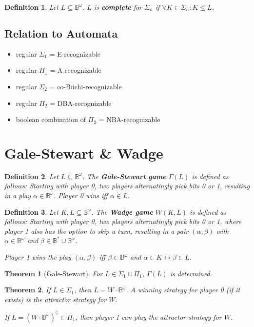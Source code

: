 \documentclass{article}
\newtheorem{theorem}{Theorem}
\newtheorem{definition}{Definition}
\begin{document}
\begin{definition}
	Let $L \subseteq \mathbb{B}^\omega$. $L$ is \textbf{complete} for $\Sigma_n$ if $\forall K \in \Sigma_n: K \leq L$. 
\end{definition}


\subsection{Relation to Automata}
\begin{itemize}
	\item regular $\Sigma_1$ = E-recognizable
	\item regular $\Pi_1$ = A-recognizable
	\item regular $\Sigma_2$ = co-Büchi-recognizable
	\item regular $\Pi_2$ = DBA-recognizable
	\item boolean combination of $\Pi_2$ = NBA-recognizable
\end{itemize}


\section{Gale-Stewart \& Wadge}
\begin{definition}
	Let $L \subseteq \mathbb{B}^\omega$. The \textbf{Gale-Stewart game} $\Gamma(L)$ is defined as follows: Starting with player 0, two players alternatingly pick bits 0 or 1, resulting in a play $\alpha \in \mathbb{B}^\omega$. Player 0 wins iff $\alpha \in L$.
\end{definition}

\begin{definition}
	Let $K, L \subseteq \mathbb{B}^\omega$. The \textbf{Wadge game} $W(K, L)$ is defined as follows: Starting with player 0, two players alternatingly pick bits 0 or 1, where player 1 also has the option to skip a turn, resulting in a pair $(\alpha, \beta)$ with $\alpha \in \mathbb{B}^\omega$ and $\beta \in \mathbb{B}^* \cup \mathbb{B}^\omega$.
	
	Player 1 wins the play $(\alpha, \beta)$ iff $\beta \in \mathbb{B}^\omega$ and $\alpha \in K \leftrightarrow \beta \in L$.  
\end{definition}

\begin{theorem}[Gale-Stewart]
	For $L \in \Sigma_1 \cup \Pi_1$, $\Gamma(L)$ is determined.
\end{theorem}
\begin{theorem}
	If $L \in \Sigma_1$, then $L = W \cdot \mathbb{B}^\omega$. A winning strategy for player 0 (if it exists) is the attractor strategy for $W$.
	
	If $L = (W \cdot \mathbb{B}^\omega)^\complement \in \Pi_1$, then player 1 can play the attractor strategy for $W$.
\end{theorem}
\end{document}

